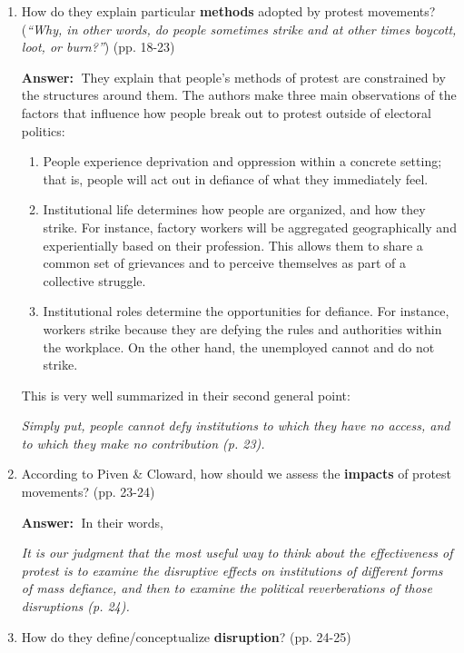 \documentclass{article}
\newcommand{\answer}{\textbf{Answer:}$\;$}
\begin{document}
\begin{enumerate}[label=\arabic*)]
    \item 
    How do they explain particular \textbf{methods} adopted by protest movements?
    (\textit{``Why, in other words, do people sometimes strike and at other times boycott, loot, or burn?''}) (pp. 18-23)

    \answer
    They explain that people's methods of protest are constrained by the structures around them.
    The authors make three main observations of the factors that influence how people break out to protest outside of electoral politics:
    \begin{enumerate}
        \item People experience deprivation and oppression within a concrete setting;
        that is, people will act out in defiance of what they immediately feel.
        \item Institutional life determines how people are organized, and how they strike.
        For instance, factory workers will be aggregated geographically and experientially based on their profession.
        This allows them to share a common set of grievances and to perceive themselves as part of a collective struggle.
        \item Institutional roles determine the opportunities for defiance.
        For instance, workers strike because they are defying the rules and authorities within the workplace.
        On the other hand, the unemployed cannot and do not strike.
    \end{enumerate}
    This is very well summarized in their second general point: 
    \begin{center}
    \textit{Simply put, people cannot defy institutions to which they have no access, and to which they make no contribution (p. 23).}
    \end{center}

    \item According to Piven \& Cloward, how should we assess the \textbf{impacts} of protest movements? (pp. 23-24)

    \answer 
    In their words, 
    \begin{center}
        \textit{It is our judgment that the most useful way to think about the effectiveness of protest is to examine the disruptive effects on institutions of different forms of mass defiance, and then to examine the political reverberations of those disruptions (p. 24).}
    \end{center}

    \item How do they define/conceptualize \textbf{disruption}? (pp. 24-25)


\end{enumerate}
\end{document}
